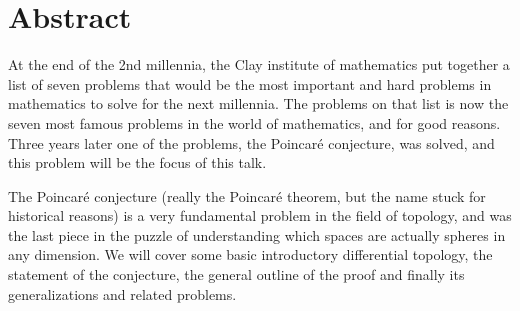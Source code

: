 
\section{Abstract}

At the end of the 2nd millennia, the Clay institute of mathematics put together a list of seven problems that would be the most important and hard problems in mathematics to solve for the next millennia. 
The problems on that list is now the seven most famous problems in the world of mathematics, and for good reasons. 
Three years later one of the problems, the Poincaré conjecture, was solved, and this problem will be the focus of this talk. 

The Poincaré conjecture (really the Poincaré theorem, but the name stuck for historical reasons) is a very fundamental problem in the field of topology, and was the last piece in the puzzle of understanding which spaces are actually spheres in any dimension. 
We will cover some basic introductory differential topology, the statement of the conjecture, the general outline of the proof and finally its generalizations and related problems.